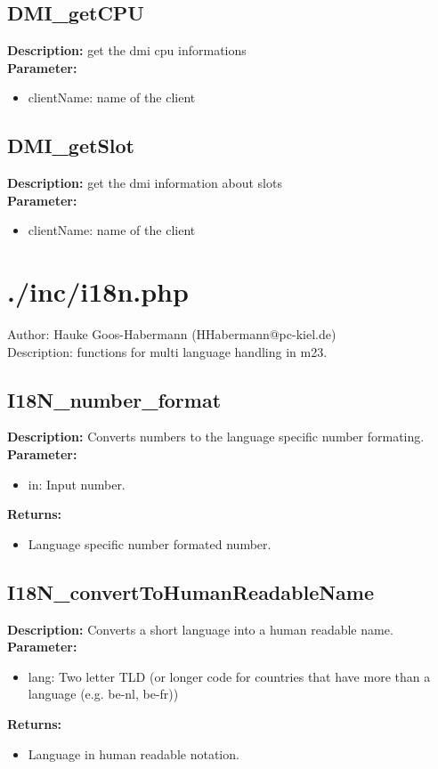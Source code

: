 \subsection{DMI\_getCPU}
\textbf{Description:} get the dmi cpu informations\\
\textbf{Parameter:}
\begin{itemize}
\item clientName: name of the client
\end{itemize}

\subsection{DMI\_getSlot}
\textbf{Description:} get the dmi information about slots\\
\textbf{Parameter:}
\begin{itemize}
\item clientName: name of the client
\end{itemize}

\newpage\section{./inc/i18n.php}
 Author: Hauke Goos-Habermann (HHabermann@pc-kiel.de)\\
 Description: functions for multi language handling in m23.\\

\subsection{I18N\_number\_format}
\textbf{Description:} Converts numbers to the language specific number formating.\\
\textbf{Parameter:}
\begin{itemize}
\item in: Input number.
\end{itemize}
\textbf{Returns:}
\begin{itemize}
\item Language specific number formated number.
\end{itemize}

\subsection{I18N\_convertToHumanReadableName}
\textbf{Description:} Converts a short language into a human readable name.\\
\textbf{Parameter:}
\begin{itemize}
\item lang: Two letter TLD (or longer code for countries that have more than a language (e.g. be-nl, be-fr))
\end{itemize}
\textbf{Returns:}
\begin{itemize}
\item Language in human readable notation.
\end{itemize}

